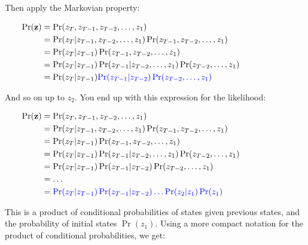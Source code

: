 \documentclass[
  12pt,
]{krantz}
\begin{document}
Then apply the Markovian property:

\begin{align*}
\Pr(\mathbf{z}) &= \Pr(z_T, z_{T-1}, z_{T-2}, \ldots, z_1) \color{white}{\Pr(z_{T-1}, z_{T-2},\ldots, z_1) \Pr(z_{T-2}, \ldots, z_1)}\\
                &= \Pr(z_T | z_{T-1}, z_{T-2},\ldots, z_1) \Pr(z_{T-1}, z_{T-2},\ldots, z_1) \\
                &= \Pr(z_T | z_{T-1}) \Pr(z_{T-1}, z_{T-2},\ldots, z_1) \\
                &= \Pr(z_T | z_{T-1}) \Pr(z_{T-1} | z_{T-2}, \ldots, z_1) \Pr(z_{T-2}, \ldots, z_1)\\
                &= \Pr(z_T | z_{T-1}) \color{blue}{\Pr(z_{T-1} | z_{T-2})} \Pr(z_{T-2}, \ldots, z_1)\\
\end{align*}

And so on up to \(z_2\). You end up with this expression for the likelihood:

\begin{align*}
\Pr(\mathbf{z}) &= \Pr(z_T, z_{T-1}, z_{T-2}, \ldots, z_1) \color{white}{\Pr(z_{T-1}, z_{T-2},\ldots, z_1) \Pr(z_{T-2}, \ldots, z_1)}\\
                &= \Pr(z_T | z_{T-1}, z_{T-2},\ldots, z_1) \Pr(z_{T-1}, z_{T-2},\ldots, z_1) \\
                &= \Pr(z_T | z_{T-1}) \Pr(z_{T-1}, z_{T-2},\ldots, z_1) \\
                &= \Pr(z_T | z_{T-1}) \Pr(z_{T-1} | z_{T-2}, \ldots, z_1) \Pr(z_{T-2}, \ldots, z_1)\\
                &= \Pr(z_T | z_{T-1}) \Pr(z_{T-1} | z_{T-2}) \Pr(z_{T-2}, \ldots, z_1)\\
                &= \ldots \\
                &= \color{blue}{\Pr(z_T | z_{T-1}) \Pr(z_{T-1} | z_{T-2}) \ldots \Pr(z_{2} | z_{1}) \Pr(z_{1})}\\
\end{align*}

This is a product of conditional probabilities of states given previous states, and the probability of initial states \(\Pr(z_1)\). Using a more compact notation for the product of conditional probabilities, we get:
\end{document}
